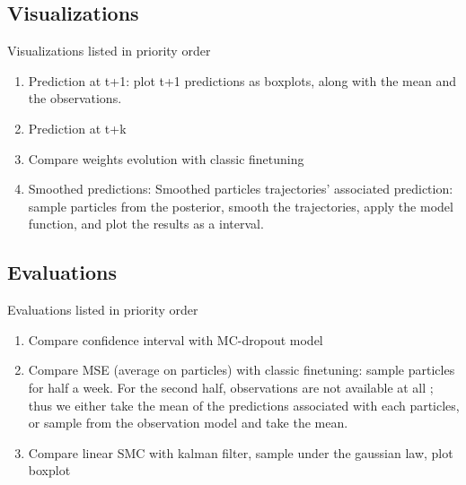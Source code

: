 \documentclass{article}
\begin{document}
\subsection{Visualizations}%
\label{sub:visualizations}

Visualizations listed in priority order
\begin{enumerate}
	\item Prediction at t+1: plot t+1 predictions as boxplots, along with the mean and the observations.
	\item Prediction at t+k
	\item Compare weights evolution with classic finetuning
	\item Smoothed predictions: Smoothed particles trajectories' associated prediction: sample particles from the posterior, smooth the trajectories, apply the model function, and plot the results as a interval.
\end{enumerate}

\subsection{Evaluations}%
\label{sub:evaluations}

Evaluations listed in priority order
\begin{enumerate}
	\item Compare confidence interval with MC-dropout model
	\item Compare MSE (average on particles) with classic finetuning: sample particles for half a week. For the second half, observations are not available at all ; thus we either take the mean of the predictions associated with each particles, or sample from the observation model and take the mean.
		\item Compare linear SMC with kalman filter, sample under the gaussian law, plot boxplot
\end{enumerate}


\end{document}
